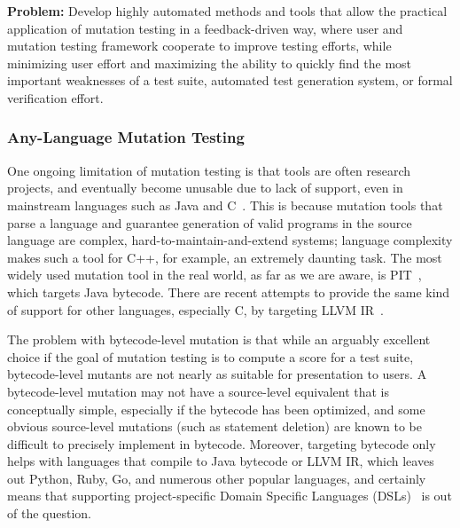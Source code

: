 \begin{framed}
{\bf Problem:}  Develop highly automated methods and tools that allow the practical application of mutation testing in a feedback-driven way, where user and mutation testing framework cooperate to improve testing efforts, while minimizing user effort and maximizing the ability to quickly find the most important weaknesses of a test suite, automated test generation system, or formal verification effort.
\end{framed}

\subsubsection{Any-Language Mutation Testing}

One ongoing limitation of mutation testing is that tools are often research projects, and eventually become unusable due to lack of support, even in mainstream languages such as Java and C~\cite{MutChoice}.  This is because mutation tools that parse a language and guarantee generation of valid programs in the source language are complex, hard-to-maintain-and-extend systems; language complexity makes such a tool for C++, for example, an extremely daunting task.  The most widely used mutation tool in the real world, as far as we are aware, is PIT~\cite{pittest}, which targets Java bytecode.  There are recent attempts to provide the same kind of support for other languages, especially C, by targeting LLVM IR~\cite{HaririLLVM}.

The problem with bytecode-level mutation is that while an arguably excellent choice if the goal of mutation testing is to compute a score for a test suite, bytecode-level mutants are not nearly as suitable for presentation to users.  A bytecode-level mutation may not have a source-level equivalent that is conceptually simple, especially if the bytecode has been optimized, and some obvious source-level mutations (such as statement deletion) are known to be difficult to precisely implement in bytecode.  Moreover, targeting bytecode only helps with languages that compile to Java bytecode or LLVM IR, which leaves out Python, Ruby, Go, and numerous other popular languages, and certainly means that supporting project-specific Domain Specific Languages (DSLs)~\cite{Fow10} is out of the question.

